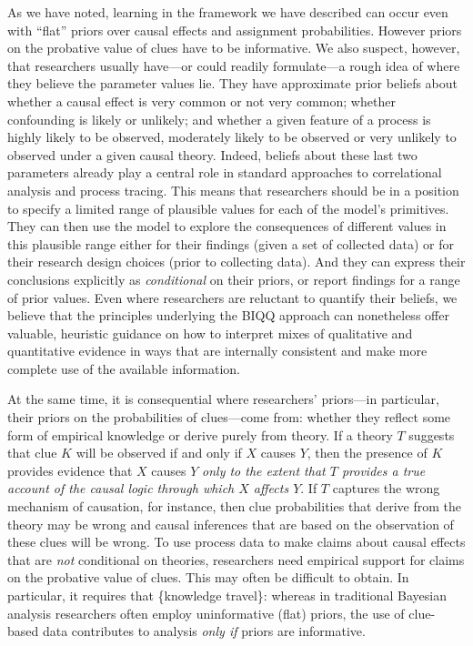 \documentclass[12pt,]{book}
\begin{document}
As we have noted, learning in the framework we have described can occur even with ``flat'' priors over causal effects and assignment probabilities. However priors on the probative value of clues have to be informative. We also suspect, however, that researchers usually have---or could readily formulate---a rough idea of where they believe the parameter values lie. They have approximate prior beliefs about whether a causal effect is very common or not very common; whether confounding is likely or unlikely; and whether a given feature of a process is highly likely to be observed, moderately likely to be observed or very unlikely to observed under a given causal theory. Indeed, beliefs about these last two parameters already play a central role in standard approaches to correlational analysis and process tracing. This means that researchers should be in a position to specify a limited range of plausible values for each of the model's primitives. They can then use the model to explore the consequences of different values in this plausible range either for their findings (given a set of collected data) or for their research design choices (prior to collecting data). And they can express their conclusions explicitly as \emph{conditional} on their priors, or report findings for a range of prior values. Even where researchers are reluctant to quantify their beliefs, we believe that the principles underlying the BIQQ approach can nonetheless offer valuable, heuristic guidance on how to interpret mixes of qualitative and quantitative evidence in ways that are internally consistent and make more complete use of the available information.

At the same time, it is consequential where researchers' priors---in particular, their priors on the probabilities of clues---come from: whether they reflect some form of empirical knowledge or derive purely from theory. If a theory \(T\) suggests that clue \(K\) will be observed if and only if \(X\) causes \(Y\), then the presence of \(K\) provides evidence that \(X\) causes \(Y\) \emph{only to the extent that \(T\) provides a true account of the causal logic through which \(X\) affects \(Y\)}. If \(T\) captures the wrong mechanism of causation, for instance, then clue probabilities that derive from the theory may be wrong and causal inferences that are based on the observation of these clues will be wrong. To use process data to make claims about causal effects that are \emph{not} conditional on theories, researchers need empirical support for claims on the probative value of clues. This may often be difficult to obtain. In particular, it requires that \{knowledge travel\}: whereas in traditional Bayesian analysis researchers often employ uninformative (flat) priors, the use of clue-based data contributes to analysis \emph{only if} priors are informative.
\end{document}
